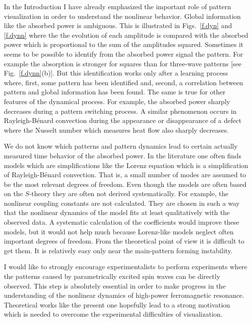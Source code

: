 In the Introduction I have already emphasized the important role of
pattern visualization in order to understand the nonlinear behavior.
Global information like the absorbed power is ambiguous. This is
illustrated in Figs.~\ref{f.dyn} and \ref{f.dynn} where the the
evolution of each amplitude is compared with the absorbed power which
is proportional to the sum of the amplitudes squared. Sometimes it
seems to be possible to identify from the absorbed power signal the 
pattern. For example the absorption is stronger for squares than for
three-wave patterns [see Fig.~\ref{f.dynn}(b)]. But this
identification works only after a learning process where, first, some
pattern has been identified and, second, a correlation between
pattern and global information has been found. The same is true for
other features of the dynamical process. For example, the absorbed
power sharply decreases during a pattern switching process. A similar
phenomenon occurs in Rayleigh-B\'enard convection during the
appearance or disappearance of a defect where the Nusselt number
which measures heat flow also sharply decreases\cite{cro.89}.

We do not know which patterns and pattern dynamics lead to certain
actually measured time behavior of the absorbed power. In the
literature one often finds models which are simplifications like the
Lorenz equation which is a simplification of Rayleigh-B\'enard
convection. That is, a small number of modes are assumed to be the
most relevant degrees of freedom. Even though the models are often
based on the $S$-theory they are often not derived systematically.
For example, the nonlinear coupling constants are not calculated.
They are chosen in such a way that the nonlinear dynamics of the
model fits at least qualitatively with the observed data. A
systematic calculation of the coefficients would improve these
models, but it would not help much because Lorenz-like models neglect
often important degrees of freedom. From the theoretical point of
view it is difficult to get them. It is relatively easy only near the
main-pattern forming instability.

I would like to strongly encourage experimentalists to perform
experiments where the patterns caused by parametrically excited spin
waves can be directly observed. This step is absolutely essential in
order to make progress in the understanding of the nonlinear dynamics
of high-power ferromagnetic resonance. Theoretical works like the
present one hopefully lead to a strong motivation which is needed to
overcome the experimental difficulties of visualization. 


